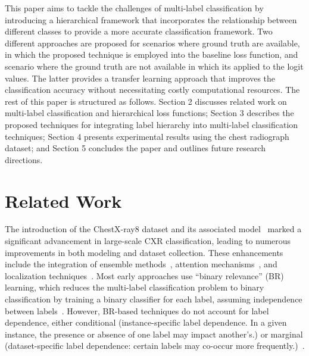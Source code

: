 This paper aims to tackle the challenges of multi-label classification by introducing a hierarchical framework that incorporates the relationship between different classes to provide a more accurate classification framework. Two different approaches are proposed for scenarios where ground truth are available, in which the proposed technique is employed into the baseline loss function, and scenario where the ground truth are not available in which its applied to the logit values. The latter provides a transfer learning approach that improves the classification accuracy without necessitating costly computational resources. The rest of this paper is structured as follows. Section 2 discusses related work on multi-label classification and hierarchical loss functions; Section 3 describes the proposed techniques for integrating label hierarchy into multi-label classification techniques; Section 4 presents experimental results using the chest radiograph dataset; and Section 5 concludes the paper and outlines future research directions.

\section{Related Work}

The introduction of the ChestX-ray8 dataset and its associated model~\cite{wang_ChestXRay8_2017} marked a significant advancement in large-scale CXR classification, leading to numerous improvements in both modeling and dataset collection. These enhancements include the integration of ensemble methods~\cite{islam_Abnormality_2017}, attention mechanisms~\cite{guan_Diagnose_2018,liu_SDFN_2019}, and localization techniques~\cite{cai_Iterative_2018,guendel_MultiTask_2019,li_Thoracic_2018,yan_Weakly_2018}. Most early approaches use ``binary relevance'' (BR) learning, which reduces the multi-label classification problem to binary classification by training a binary classifier for each label, assuming independence between labels~\cite{zhang_Review_2014}. However, BR-based techniques do not account for label dependence, either conditional (instance-specific label dependence. In a given instance, the presence or absence of one label may impact another's.) or marginal (dataset-specific label dependence: certain labels may co-occur more frequently.)~\cite{dembczynski_Label_2012}.

